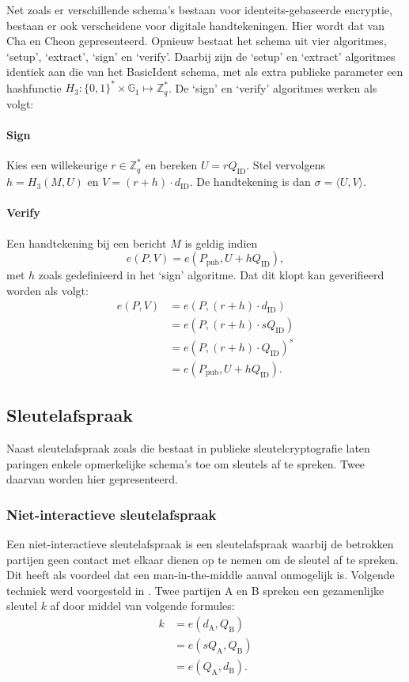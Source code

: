 Net zoals er verschillende schema's bestaan voor identeits-gebaseerde  encryptie, bestaan er ook verscheidene voor digitale handtekeningen. Hier wordt dat van Cha en Cheon \cite{cha} gepresenteerd. Opnieuw bestaat het schema uit vier algoritmes, `setup', `extract', `sign' en `verify'. Daarbij zijn de `setup' en `extract' algoritmes identiek aan die van het BasicIdent schema, met als extra publieke parameter een hashfunctie $H_3 : \{ 0,1 \} ^* \times \mathbb{G}_1 \mapsto \mathbb{Z}_q ^*$. De `sign' en `verify' algoritmes werken als volgt:

\paragraph{Sign} Kies een willekeurige $r \in \mathbb{Z}_q^*$ en bereken $U = r Q_{\text{ID}}$. Stel vervolgens $h = H_3(M, U)$ en $V = (r + h) \cdot d_{\text{ID}}$. De handtekening is dan $\sigma = \langle U, V \rangle$.

\paragraph{Verify} Een handtekening bij een bericht $M$ is geldig indien
\[e(P, V) = e(P_{\text{pub}}, U + h Q_{\text{ID}}),\]
met $h$ zoals gedefinieerd in het `sign' algoritme. Dat dit klopt kan geverifieerd worden als volgt:
\[\begin{aligned}
e(P, V)	&= e(P, (r + h) \cdot d_{\text{ID}})\\
			&= e(P, (r + h) \cdot s Q_{\text{ID}})\\
			&= e(P, (r + h) \cdot Q_{\text{ID}})^s\\
			&= e(P_{\text{pub}}, U + h Q_{\text{ID}}).
\end{aligned}\]

\subsection{Sleutelafspraak}

Naast sleutelafspraak zoals die bestaat in publieke sleutelcryptografie laten paringen enkele opmerkelijke schema's toe om sleutels af te spreken. Twee daarvan worden hier gepresenteerd.

\subsubsection{Niet-interactieve sleutelafspraak}

Een niet-interactieve sleutelafspraak is een sleutelafspraak waarbij de betrokken partijen geen contact met elkaar dienen op te nemen om de sleutel af te spreken. Dit heeft als voordeel dat een man-in-the-middle aanval onmogelijk is. Volgende techniek werd voorgesteld in \cite{sakai}. Twee partijen A en B spreken een gezamenlijke sleutel $k$ af door middel van volgende formules:
\[\begin{aligned}
k	&= e(d_{\text{A}}, Q_{\text{B}})\\
	&= e(s Q_{\text{A}}, Q_{\text{B}})\\
	&= e(Q_{\text{A}}, d_{\text{B}}).
\end{aligned}\]

